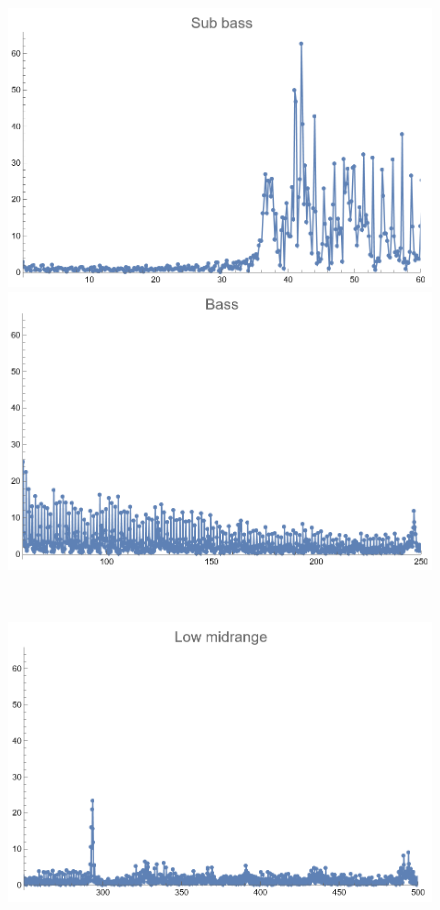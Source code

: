 \documentclass[12pt, letterpaper]{article}
\begin{document}
\begin{figure}[H]
  \centering
  \begin{minipage}{.3\textwidth}
    \centering
    \includegraphics[width=.9\linewidth]{imgs/Cancion2/subbass.png}
  \end{minipage}
  \begin{minipage}{0.03\textwidth}\end{minipage}
  \begin{minipage}{.3\textwidth}
    \centering
    \includegraphics[width=.9\linewidth]{imgs/Cancion2/bass.png}
  \end{minipage} \medskip \\
  \begin{minipage}{.3\textwidth}
    \centering
    \includegraphics[width=.9\linewidth]{imgs/Cancion2/lowmid.png}

\end{minipage}
\end{figure}
\end{document}
